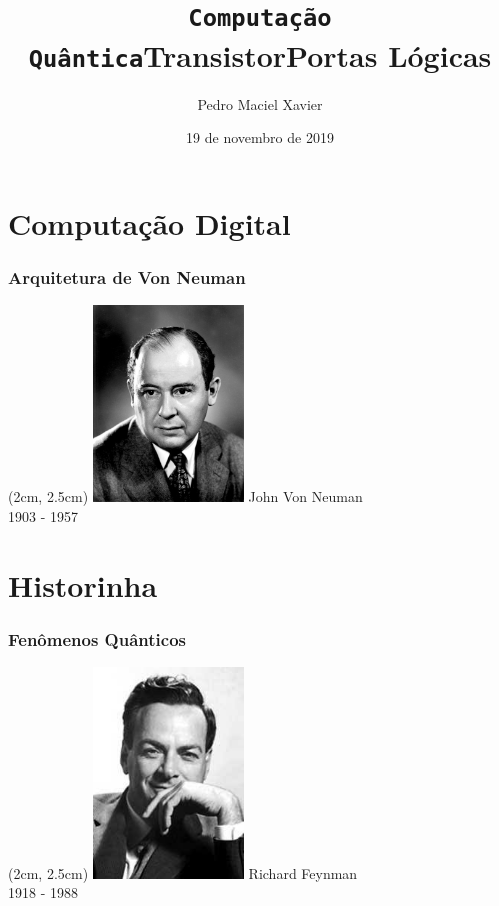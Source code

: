 \documentclass[14pt]{beamer}
\title{\texttt{Computação Quântica}}
\institute{IM-UFRJ}
\date{19 de novembro de 2019}
\author{Pedro Maciel Xavier}
\begin{document}
	

	\section{Computação Digital}	
	\frame%
	{
		\title{Transistor}
	}

	\frame%
	{
		\title{Portas Lógicas}
	}

	\frame%
	{
		\frametitle{Arquitetura de Von Neuman}
		
		\begin{textblock*}{4cm}(2cm, 2.5cm) %
			\includegraphics[width=4cm]{von-neuman.jpg}
			John Von Neuman\\
			{\centering\small 1903 - 1957}
		\end{textblock*}
	}

	\section{Historinha}
	\frame%
	{
		\frametitle{Fenômenos Quânticos}
		
		\begin{textblock*}{4cm}(2cm, 2.5cm) %
			\includegraphics[width=4cm]{feynman.jpg}
			Richard Feynman\\
			{\centering\small 1918 - 1988}
		\end{textblock*}		
	}
	
	\frame%
	{
				
	}
\end{document}
